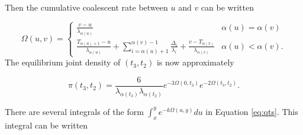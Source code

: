 \documentclass{article}
\begin{document}
Then the cumulative coalescent rate between $u$ and $v$ can be written

\begin{equation}
    \Omega(u,v) =
    \begin{cases}
        \frac{v-u}{\lambda_{\alpha(u)}} & \alpha(u) = \alpha(v)\\[1em]
        \frac{T_{\alpha(u)+1}-u}{\lambda_{\alpha(u)}} +
          \sum_{i=\alpha(u)+1}^{\alpha(v)-1}\frac{\Delta_i}{\lambda_i} +
          \frac{v-T_{\alpha(v)}}{\lambda_{\alpha(v)}}
          & \alpha(u) < \alpha(v).
    \end{cases}
\end{equation}
The equilibrium joint density of $(t_3,t_2)$ is now approximately

\begin{equation}
    \pi(t_3,t_2) = \frac{6}{\lambda_{\alpha(t_3)}\lambda_{\alpha(t_2)}}e^{-3\Omega(0,t_3)}e^{-2\Omega(t_3,t_2)}.
    \label{eq:marginal}
\end{equation}

There are several integrals of the form $\int_x^y e^{-k\Omega(u,y)}du$ in
Equation \eqref{eq:qts}. This integral can be written
\end{document}
